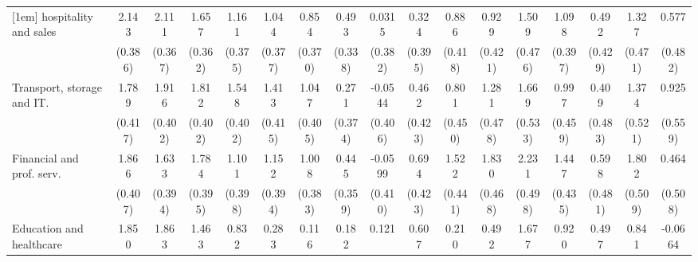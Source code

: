 {\begin{tabular}{l*{16}{c}}
[1em]
hospitality and sales&       2.143\sym{***}&       2.111\sym{***}&       1.657\sym{***}&       1.161\sym{**} &       1.044\sym{**} &       0.854\sym{*}  &       0.493         &      0.0315         &       0.324         &       0.886\sym{*}  &       0.929\sym{*}  &       1.509\sym{**} &       1.098\sym{**} &       0.492         &       1.327\sym{**} &       0.577         \\
                    &     (0.386)         &     (0.367)         &     (0.362)         &     (0.375)         &     (0.377)         &     (0.370)         &     (0.338)         &     (0.382)         &     (0.395)         &     (0.418)         &     (0.421)         &     (0.476)         &     (0.397)         &     (0.429)         &     (0.471)         &     (0.482)         \\
[1em]
Transport, storage and IT.&       1.789\sym{***}&       1.916\sym{***}&       1.812\sym{***}&       1.548\sym{***}&       1.413\sym{***}&       1.047\sym{**} &       0.271         &     -0.0544         &       0.462         &       0.801         &       1.281\sym{**} &       1.669\sym{**} &       0.997\sym{*}  &       0.409         &       1.374\sym{**} &       0.925         \\
                    &     (0.417)         &     (0.402)         &     (0.402)         &     (0.402)         &     (0.415)         &     (0.405)         &     (0.374)         &     (0.406)         &     (0.423)         &     (0.450)         &     (0.478)         &     (0.533)         &     (0.459)         &     (0.483)         &     (0.521)         &     (0.559)         \\
[1em]
Financial and prof. serv.&       1.866\sym{***}&       1.633\sym{***}&       1.784\sym{***}&       1.101\sym{**} &       1.152\sym{**} &       1.008\sym{**} &       0.445         &     -0.0599         &       0.694         &       1.522\sym{***}&       1.830\sym{***}&       2.231\sym{***}&       1.447\sym{***}&       0.598         &       1.802\sym{***}&       0.464         \\
                    &     (0.407)         &     (0.394)         &     (0.395)         &     (0.398)         &     (0.394)         &     (0.383)         &     (0.359)         &     (0.410)         &     (0.423)         &     (0.441)         &     (0.468)         &     (0.498)         &     (0.435)         &     (0.481)         &     (0.509)         &     (0.508)         \\
[1em]
Education and healthcare&       1.850\sym{***}&       1.863\sym{***}&       1.463\sym{**} &       0.832         &       0.283         &       0.116         &       0.182         &       0.121         &       0.607         &       0.210         &       0.492         &       1.677\sym{**} &       0.920         &       0.497         &       0.841         &     -0.0664         \\

\end{tabular}}
